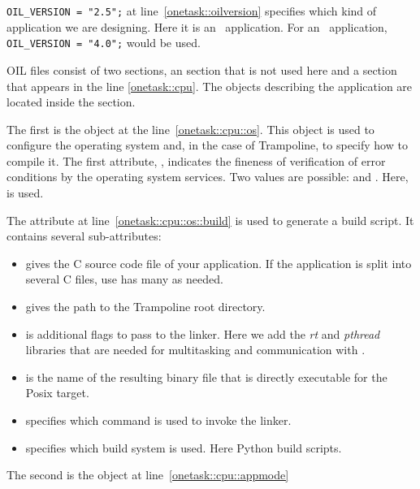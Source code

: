 \lstinline[language=OIL]{OIL_VERSION = "2.5";} at line~\ref{onetask::oilversion} specifies which kind of application we are designing. Here it is an \osek\ application. For an \autosar\ application, \lstinline[language=OIL]{OIL_VERSION = "4.0";} would be used.

OIL files consist of two sections, an  section that is not used here and a  section that appears in the line \ref{onetask::cpu}. The objects describing the application are located inside the  section.

The first is the  object at the line~\ref{onetask::cpu::os}. This object is used to configure the operating system and, in the case of Trampoline, to specify how to compile it. The first attribute, , indicates the fineness of verification of error conditions by the operating system services. Two values are possible:  and . Here,  is used.

The  attribute at line~\ref{onetask::cpu::os::build} is used to generate a build script. It contains several sub-attributes:
\begin{itemize}
\item {} gives the C source code file of your application. If the application is split into several C files, use has many  as needed.
\item {} gives the path to the Trampoline root directory.
\item {} is additional flags to pass to the linker. Here we add the \emph{rt} and \emph{pthread} libraries that are needed for multitasking and communication with . 
\item {} is the name of the resulting binary file that is directly executable for the Posix target.
\item {} specifies which command is used to invoke the linker.
\item {} specifies which build system is used. Here Python build scripts.
\end{itemize}

The second is the object  at line~\ref{onetask::cpu::appmode}